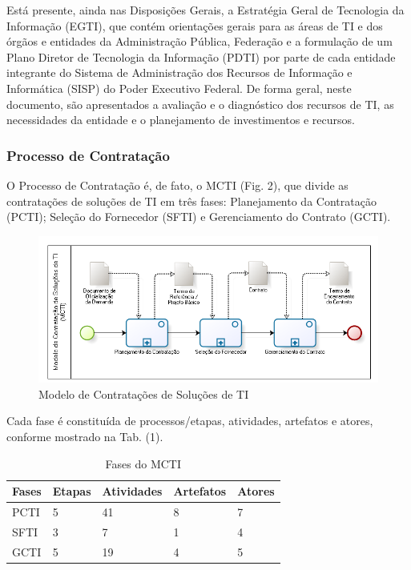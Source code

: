 Está presente, ainda nas Disposições Gerais, a Estratégia Geral de Tecnologia da Informação (EGTI), que contém orientações gerais para as áreas de TI e dos órgãos e entidades da Administração Pública, Federação e a formulação de um Plano Diretor de Tecnologia da Informação (PDTI) por parte de cada entidade integrante do Sistema de Administração dos Recursos de Informação e Informática (SISP) do Poder Executivo Federal. De forma geral, neste documento, são apresentados a avaliação e o diagnóstico dos recursos de TI, as necessidades da entidade e o planejamento de investimentos e recursos.

\subsubsection[Processo de Contratação]{Processo de Contratação}

O Processo de Contratação é, de fato, o MCTI (Fig. 2), que divide as contratações de soluções de TI em três fases: Planejamento da Contratação (PCTI); Seleção do Fornecedor (SFTI) e Gerenciamento do Contrato (GCTI).

\begin{figure}[h]
		\centering
		\label{fig05}
			\includegraphics[scale=0.8]{figuras/MCTI.png}
		\caption{Modelo de Contratações de Soluções de TI   \cite{mcti}}
\end{figure}


Cada fase é constituída de processos/etapas, atividades, artefatos e atores, conforme mostrado na Tab. (1).
  
\begin{table}[htb]
\center
\footnotesize
\begin{tabular}{|p{1.4cm}|p{1cm}|p{3cm}|p{3cm}|p{3cm}|}
  \hline
   \textbf{Fases} & \textbf{Etapas}  & \textbf{Atividades}  & \textbf{Artefatos} & \textbf{Atores}  \\
    \hline
    PCTI & 5 & 41 & 8 & 7\\
   \hline    
    SFTI & 3 & 7 & 1 & 4\\
    \hline
    GCTI & 5 & 19 & 4 & 5\\
   \hline
\end{tabular}
\caption{Fases do MCTI}
\end{table}

